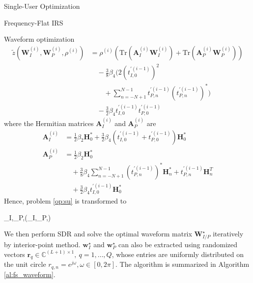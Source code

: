 \documentclass{IEEEtran}
\begin{document}
\begin{section}{Single-User Optimization}
\begin{subsection}{Frequency-Flat IRS}
\begin{subsubsection}{Waveform optimization}
			\begin{equation}\label{eq:z_waveform_approx}
				\begin{split}
					\tilde{z}(\boldsymbol{W}_I^{(i)},\boldsymbol{W}_P^{(i)},\rho^{(i)})
					& = \rho^{(i)}\left(\mathrm{Tr}(\boldsymbol{A}_I^{(i)}\boldsymbol{W}_I^{(i)}) + \mathrm{Tr}(\boldsymbol{A}_P^{(i)}\boldsymbol{W}_P^{(i)})\right)\\
					& \quad - \frac{3}{8} \beta_4 \Biggl(2 (t_{I,0}^{\prime (i-1)})^2\\
					& \quad \quad + \sum_{n=-N+1}^{N-1} t_{P,n}^{\prime (i-1)} (t_{P,n}^{\prime (i-1)})^*\Biggl)\\
					& \quad - \frac{3}{2} \beta_4 t_{I,0}^{\prime (i-1)} t_{P,0}^{\prime (i-1)}
				\end{split}
			\end{equation}
			where the Hermitian matrices $\boldsymbol{A}_I^{(i)}$ and $\boldsymbol{A}_P^{(i)}$ are
			\begin{align}
				\boldsymbol{A}_I^{(i)}
				& = \frac{1}{2} \beta_2 \boldsymbol{H}_0^* + \frac{3}{2} \beta_4 (t_{I,0}^{\prime (i-1)} + t_{P,0}^{\prime (i-1)})\boldsymbol{H}_{0}^*\label{eq:A_I}\\
				\boldsymbol{A}_P^{(i)}
				& = \frac{1}{2} \beta_2 \boldsymbol{H}_0^*\nonumber\\
				& \quad + \frac{3}{8} \beta_4 \sum_{n=-N+1}^{N-1} (t_{P,n}^{\prime (i-1)})^*\boldsymbol{H}_{n}^* + t_{P,n}^{\prime (i-1)}\boldsymbol{H}_{n}^T\nonumber\\
				& \quad + \frac{3}{2} \beta_4 t_{I,0}^{\prime (i-1)}\boldsymbol{H}_{0}^*\label{eq:A_P}
			\end{align}
			Hence, problem \ref{op:su} is transformed to
			\begin{maxi!}
				{\boldsymbol{W}_I,_P,\rho}{(\boldsymbol{W}_I,_P,\rho)}{\label{op:su_waveform}}{\label{eq:su_waveform_target}}
			\end{maxi!}
			We then perform SDR and solve the optimal waveform matrix $\boldsymbol{W}_{I/P}^{\star}$ iteratively by interior-point method. $\boldsymbol{w}_I^{\star}$ and $\boldsymbol{w}_P^{\star}$ can also be extracted using randomized vectors $\boldsymbol{r}_q \in \mathbb{C}^{(L+1) \times 1}, \ q=1,\dots,Q$, whose entries are uniformly distributed on the unit circle $r_{q,n}=e^{j\omega}, \omega \in [0,2\pi]$. The algorithm is summarized in Algorithm \ref{al:fs_waveform}.


\end{subsubsection}
\end{subsection}
\end{section}
\end{document}
